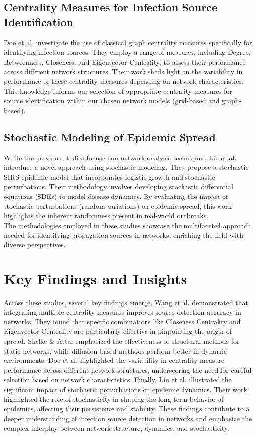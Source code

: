 \subsection{Centrality Measures for Infection Source Identification}
Doe et al. \cite{doe2018} investigate the use of classical graph centrality measures specifically for identifying infection sources. They employ a range of measures, including Degree, Betweenness, Closeness, and Eigenvector Centrality, to assess their performance across different network structures. Their work sheds light on the variability in performance of these centrality measures depending on network characteristics. This knowledge informs our selection of appropriate centrality measures for source identification within our chosen network models (grid-based and graph-based).

\subsection{Stochastic Modeling of Epidemic Spread}
While the previous studies focused on network analysis techniques, Liu et al. \cite{liu2020} introduce a novel approach using stochastic modeling. They propose a stochastic SIRS epidemic model that incorporates logistic growth and stochastic perturbations. Their methodology involves developing stochastic differential equations (SDEs) to model disease dynamics. By evaluating the impact of stochastic perturbations (random variations) on epidemic spread, this work highlights the inherent randomness present in real-world outbreaks.\\

The methodologies employed in these studies showcase the multifaceted approach needed for identifying propagation sources in networks, enriching the field with diverse perspectives.

\section{Key Findings and Insights}
Across these studies, several key findings emerge. Wang et al. \cite{wang2020} demonstrated that integrating multiple centrality measures improves source detection accuracy in networks. They found that specific combinations like Closeness Centrality and Eigenvector Centrality are particularly effective in pinpointing the origin of spread. Shelke \& Attar \cite{shelke2019} emphasized the effectiveness of structural methods for static networks, while diffusion-based methods perform better in dynamic environments. Doe et al. \cite{doe2018} highlighted the variability in centrality measure performance across different network structures, underscoring the need for careful selection based on network characteristics. Finally, Liu et al. \cite{liu2020} illustrated the significant impact of stochastic perturbations on epidemic dynamics. Their work highlighted the role of stochasticity in shaping the long-term behavior of epidemics, affecting their persistence and stability. These findings contribute to a deeper understanding of infection source detection in networks and emphasize the complex interplay between network structure, dynamics, and stochasticity.

